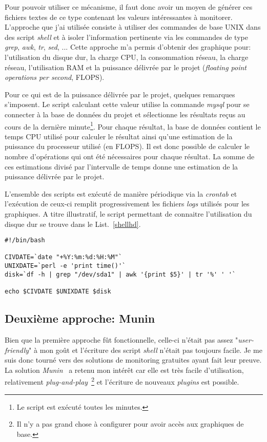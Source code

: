\documentclass[a4paper, 11pt]{report}
\begin{document}
Pour pouvoir utiliser ce mécanisme, il faut donc avoir un moyen de générer ces fichiers textes de ce type contenant les valeurs intéressantes à monitorer. L'approche que j'ai utilisée consiste à utiliser des commandes de base UNIX dans des script \textit{shell} et à isoler l'information pertinente via les commandes de type \textit{grep}, \textit{awk}, \textit{tr}, \textit{sed}, ... Cette approche m'a permis d'obtenir des graphique pour: l'utilisation du disque dur, la charge CPU, la consommation réseau, la charge réseau, l'utilisation RAM et la puissance délivrée par le projet (\textit{floating point operations per second}, FLOPS).

Pour ce qui est de la puissance délivrée par le projet, quelques remarques s'imposent. Le script calculant cette valeur utilise la commande \textit{mysql} pour se connecter à la base de données du projet et sélectionne les résultats reçus au cours de la dernière minute\footnote{Le script est exécuté toutes les minutes.}. Pour chaque résultat, la base de données contient le temps CPU utilisé pour calculer le résultat ainsi qu'une estimation de la puissance du processeur utilisé (en FLOPS). Il est donc possible de calculer le nombre d'opérations qui ont été nécessaires pour chaque résultat. La somme de ces estimations divisé par l'intervalle de temps donne une estimation de la puissance délivrée par le projet.

L'ensemble des scripts est exécuté de manière périodique via la \textit{crontab} et l'exécution de ceux-ci remplit progressivement les fichiers \textit{logs} utilisés pour les graphiques. A titre illustratif, le script permettant de connaitre l'utilisation du disque dur se trouve dans le List.~\ref{shellhd}. %


\begin{lstlisting}
#!/bin/bash

CIVDATE=`date "+%Y:%m:%d:%H:%M"`
UNIXDATE=`perl -e 'print time()'`
disk=`df -h | grep "/dev/sda1" | awk '{print $5}' | tr '%' ' '`

echo $CIVDATE $UNIXDATE $disk
\end{lstlisting}


\subsection{Deuxième approche: Munin}
Bien que la première approche fût fonctionnelle, celle-ci n'était pas assez "\textit{user-friendly}" à mon goût et l'écriture des script \textit{shell} n'était pas toujours facile. Je me suis donc tourné vers des solutions de monitoring gratuites ayant fait leur preuve. La solution \textit{Munin}~\cite{MUNIN} a retenu mon intérêt car elle est très facile d'utilisation, relativement \textit{plug-and-play}~\footnote{Il n'y a pas grand chose à configurer pour avoir accès aux graphiques de base.} et l'écriture de nouveaux \textit{plugins} est possible.
\end{document}
